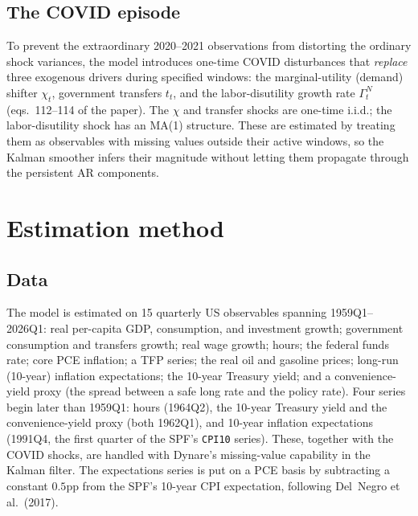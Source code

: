 \documentclass[11pt]{article}
\theoremstyle{definition}
\begin{document}
\subsection{The COVID episode}
To prevent the extraordinary 2020--2021 observations from distorting the ordinary shock variances, the
model introduces one-time COVID disturbances that \emph{replace} three exogenous drivers during
specified windows: the marginal-utility (demand) shifter $\chi_t$, government transfers $t_t$, and the
labor-disutility growth rate $\Gamma^N_t$ (eqs.\ 112--114 of the paper). The $\chi$ and transfer shocks
are one-time i.i.d.; the labor-disutility shock has an MA(1) structure. These are estimated by treating
them as observables with missing values outside their active windows, so the Kalman smoother infers
their magnitude without letting them propagate through the persistent AR components.

\section{Estimation method}\label{sec:estimation}

\subsection{Data}
The model is estimated on 15 quarterly US observables spanning 1959Q1--2026Q1: real per-capita GDP,
consumption, and investment growth; government consumption and transfers growth; real wage growth; hours;
the federal funds rate; core PCE inflation; a TFP series; the real oil and gasoline prices; long-run
(10-year) inflation expectations; the 10-year Treasury yield; and a convenience-yield proxy (the spread
between a safe long rate and the policy rate). Four series begin later than 1959Q1: hours (1964Q2), the
10-year Treasury yield and the convenience-yield proxy (both 1962Q1), and 10-year inflation expectations
(1991Q4, the first quarter of the SPF's \texttt{CPI10} series). These, together with the COVID shocks,
are handled with Dynare's missing-value capability in the Kalman filter. The expectations series is put
on a PCE basis by subtracting a constant $0.5$pp from the SPF's 10-year CPI expectation, following
Del~Negro et al.\ (2017).
\end{document}
